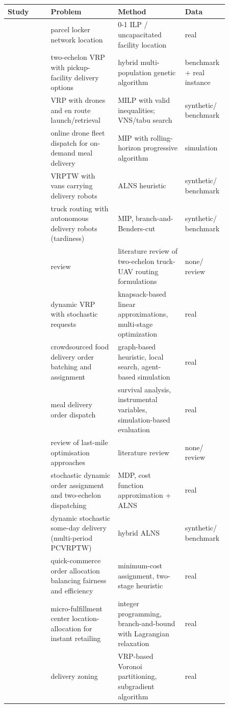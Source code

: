 \begin{tabular}{p{0.18\linewidth}p{0.28\linewidth}p{0.28\linewidth}p{0.12\linewidth}}
\toprule
Study & Problem & Method & Data \\
\midrule
\citet{deutsch2017} & parcel locker network location & 0-1 ILP / uncapacitated facility location & real \\
\citet{zhou2017} & two-echelon VRP with pickup-facility delivery options & hybrid multi-population genetic algorithm & benchmark + real instance \\
\citet{schermer2019} & VRP with drones and en route launch/retrieval & MILP with valid inequalities; VNS/tabu search & synthetic/ benchmark \\
\citet{liu2019} & online drone fleet dispatch for on-demand meal delivery & MIP with rolling-horizon progressive algorithm & simulation \\
\citet{chen2021} & VRPTW with vans carrying delivery robots & ALNS heuristic & synthetic/ benchmark \\
\citet{alfandari2021} & truck routing with autonomous delivery robots (tardiness) & MIP, branch-and-Benders-cut & synthetic/ benchmark \\
\citet{li2021} & review & literature review of two-echelon truck-UAV routing formulations & none/ review \\
\citet{zhang2022} & dynamic VRP with stochastic requests & knapsack-based linear approximations, multi-stage optimization & real \\
\citet{simoni2023} & crowdsourced food delivery order batching and assignment & graph-based heuristic, local search, agent-based simulation & real \\
\citet{mao2025} & meal delivery order dispatch & survival analysis, instrumental variables, simulation-based evaluation & real \\
\citet{shuaibu2025} & review of last-mile optimisation approaches & literature review & none/ review \\
\citet{zamal2025} & stochastic dynamic order assignment and two-echelon dispatching & MDP, cost function approximation + ALNS & real \\
\citet{voigt2025} & dynamic stochastic some-day delivery (multi-period PCVRPTW) & hybrid ALNS & synthetic/ benchmark \\
\citet{bhattacharya2026} & quick-commerce order allocation balancing fairness and efficiency & minimum-cost assignment, two-stage heuristic & real \\
\citet{luo2026} & micro-fulfillment center location-allocation for instant retailing & integer programming, branch-and-bound with Lagrangian relaxation & real \\
\citet{carlsson2026} & delivery zoning & VRP-based Voronoi partitioning, subgradient algorithm & real \\
\bottomrule
\end{tabular}
